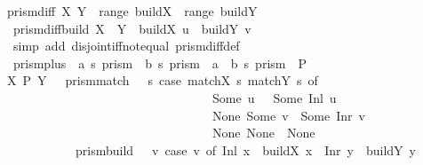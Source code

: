 \begin{isabellebody}
{\isachardoublequoteopen}prism{\isacharunderscore}diff\ X\ Y\ {\isacharequal}\ {\isacharparenleft}range\ build\isactrlbsub X\isactrlesub \ {\isasyminter}\ range\ build\isactrlbsub Y\isactrlesub \ {\isacharequal}\ {\isacharbraceleft}{\isacharbraceright}{\isacharparenright}{\isachardoublequoteclose}\isanewline
\isanewline
{}\isamarkupfalse%
\ prism{\isacharunderscore}diff{\isacharunderscore}build{\isacharcolon}\ {\isachardoublequoteopen}X\ {\isasymnabla}\ Y\ {\isasymLongrightarrow}\ build\isactrlbsub X\isactrlesub \ u\ {\isasymnoteq}\ build\isactrlbsub Y\isactrlesub \ v{\isachardoublequoteclose}\isanewline
%
\isadelimproof
\ \ %
\endisadelimproof
%
\isatagproof
{}\isamarkupfalse%
\ {\isacharparenleft}simp\ add{\isacharcolon}\ disjoint{\isacharunderscore}iff{\isacharunderscore}not{\isacharunderscore}equal\ prism{\isacharunderscore}diff{\isacharunderscore}def{\isacharparenright}%
\endisatagproof
{\isafoldproof}%
%
\isadelimproof
\isanewline
%
\endisadelimproof
\ \ \ \ \isanewline
{}\isamarkupfalse%
\ prism{\isacharunderscore}plus\ {\isacharcolon}{\isacharcolon}\ {\isachardoublequoteopen}{\isacharparenleft}{\isacharprime}a{\isacharcomma}\ {\isacharprime}s{\isacharparenright}\ prism\ {\isasymRightarrow}\ {\isacharparenleft}{\isacharprime}b{\isacharcomma}\ {\isacharprime}s{\isacharparenright}\ prism\ {\isasymRightarrow}\ {\isacharparenleft}{\isacharprime}a\ {\isacharplus}\ {\isacharprime}b{\isacharcomma}\ {\isacharprime}s{\isacharparenright}\ prism{\isachardoublequoteclose}\ {\isacharparenleft}\ {\isachardoublequoteopen}{\isacharplus}\isactrlsub P{\isachardoublequoteclose}\ {}{}{\isacharparenright}\ \isanewline
{\isachardoublequoteopen}X\ {\isacharplus}\isactrlsub P\ Y\ {\isacharequal}\ {\isasymlparr}\ prism{\isacharunderscore}match\ {\isacharequal}\ {\isacharparenleft}{\isasymlambda}\ s{\isachardot}\ case\ {\isacharparenleft}match\isactrlbsub X\isactrlesub \ s{\isacharcomma}\ match\isactrlbsub Y\isactrlesub \ s{\isacharparenright}\ of\ \isanewline
\ \ \ \ \ \ \ \ \ \ \ \ \ \ \ \ \ \ \ \ \ \ \ \ \ \ \ \ \ \ \ \ \ {\isacharparenleft}Some\ u{\isacharcomma}\ {\isacharunderscore}{\isacharparenright}\ {\isasymRightarrow}\ Some\ {\isacharparenleft}Inl\ u{\isacharparenright}\ {\isacharbar}\isanewline
\ \ \ \ \ \ \ \ \ \ \ \ \ \ \ \ \ \ \ \ \ \ \ \ \ \ \ \ \ \ \ \ \ {\isacharparenleft}None{\isacharcomma}\ Some\ v{\isacharparenright}\ {\isasymRightarrow}\ Some\ {\isacharparenleft}Inr\ v{\isacharparenright}\ {\isacharbar}\isanewline
\ \ \ \ \ \ \ \ \ \ \ \ \ \ \ \ \ \ \ \ \ \ \ \ \ \ \ \ \ \ \ \ \ {\isacharparenleft}None{\isacharcomma}\ None{\isacharparenright}\ {\isasymRightarrow}\ None{\isacharparenright}{\isacharcomma}\isanewline
\ \ \ \ \ \ \ \ \ \ \ prism{\isacharunderscore}build\ {\isacharequal}\ {\isacharparenleft}{\isasymlambda}\ v{\isachardot}\ case\ v\ of\ Inl\ x\ {\isasymRightarrow}\ build\isactrlbsub X\isactrlesub \ x\ {\isacharbar}\ Inr\ y\ {\isasymRightarrow}\ build\isactrlbsub Y\isactrlesub \ y{\isacharparenright}\ {\isasymrparr}{\isachardoublequoteclose}\isanewline
%
\isadelimtheory
\isanewline
%
\endisadelimtheory
%
\isatagtheory
{}\isamarkupfalse%
%
\endisatagtheory
{\isafoldtheory}%
%
\isadelimtheory
%
\endisadelimtheory
%
\end{isabellebody}%
